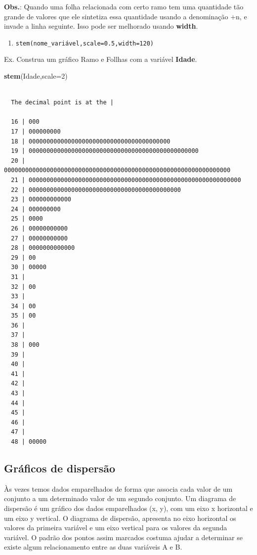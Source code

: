 \documentclass[12pt,brazil,]{book}
\newenvironment{Shaded}{\begin{snugshade}}{\end{snugshade}}
\newcommand{\DataTypeTok}[1]{\textcolor[rgb]{0.13,0.29,0.53}{#1}}
\newcommand{\DecValTok}[1]{\textcolor[rgb]{0.00,0.00,0.81}{#1}}
\newcommand{\KeywordTok}[1]{\textcolor[rgb]{0.13,0.29,0.53}{\textbf{#1}}}
\newcommand{\NormalTok}[1]{#1}
\providecommand{\tightlist}{%
  \setlength{\itemsep}{0pt}\setlength{\parskip}{0pt}}
\begin{document}
\textbf{Obs.}: Quando uma folha relacionada com certo ramo tem uma
quantidade tão grande de valores que ele sintetiza essa quantidade
usando a denominação +n, e invade a linha seguinte. Isso pode ser
melhorado usando \textbf{width}.

\begin{enumerate}
\def\labelenumi{\alph{enumi})}
\setcounter{enumi}{2}
\tightlist
\item
  \texttt{stem(nome\_variável,scale=0.5,width=120)}
\end{enumerate}

Ex. Construa um gráfico Ramo e Follhas com a variável \textbf{Idade}.

\begin{Shaded}
\begin{Highlighting}[]
\KeywordTok{stem}\NormalTok{(Idade,}\DataTypeTok{scale=}\DecValTok{2}\NormalTok{)}
\end{Highlighting}
\end{Shaded}

\begin{verbatim}

  The decimal point is at the |

  16 | 000
  17 | 000000000
  18 | 0000000000000000000000000000000000000000
  19 | 000000000000000000000000000000000000000000000000
  20 | 0000000000000000000000000000000000000000000000000000000000000000
  21 | 000000000000000000000000000000000000000000000000000000000000
  22 | 0000000000000000000000000000000000000000000
  23 | 000000000000
  24 | 000000000
  25 | 0000
  26 | 00000000000
  27 | 00000000000
  28 | 0000000000000
  29 | 00
  30 | 00000
  31 | 
  32 | 00
  33 | 
  34 | 00
  35 | 00
  36 | 
  37 | 
  38 | 000
  39 | 
  40 | 
  41 | 
  42 | 
  43 | 
  44 | 
  45 | 
  46 | 
  47 | 
  48 | 00000
\end{verbatim}

\hypertarget{graficos-de-dispersao}{%
\subsection{Gráficos de dispersão}\label{graficos-de-dispersao}}

Às vezes temos dados emparelhados de forma que associa cada valor de um
conjunto a um determinado valor de um segundo conjunto. Um diagrama de
dispersão é um gráfico dos dados emparelhados (x, y), com um eixo x
horizontal e um eixo y vertical. O diagrama de dispersão, apresenta no
eixo horizontal os valores da primeira variável e um eixo vertical para
os valores da segunda variável. O padrão dos pontos assim marcados
costuma ajudar a determinar se existe algum relacionamento entre as duas
variáveis A e B.
\end{document}
